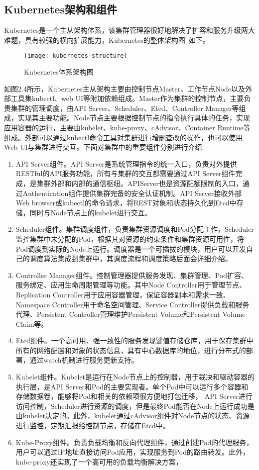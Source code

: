 \subsection{Kubernetes架构和组件}
Kubernetes是一个主从架构体系，该集群管理器很好地解决了扩容和服务升级两大难题，具有较强的横向扩展能力，Kubernetes的整体架构图~\cite{KUBdoc}如下。
\begin{figure}[H] %
	\centering
	\texttt{[image: kubernetes-structure]}
	\caption{Kubernetes体系架构图~\cite{KUBdoc}}
\end{figure}
如图2.4所示，Kubernetes主从架构主要由控制节点Master、工作节点Node以及外部工具集kubectl、web UI等附加依赖组成。Master作为集群的控制节点，主要负责集群的管理调度，由API Server、Scheduler、Etcd、Controller Manager等组成，实现其主要功能。Node节点主要根据控制节点的指令执行具体的任务，实现应用容器的运行，主要由kubelet、kube-proxy、cAdvisor、Container Runtime等组成。外部可以通过kubectl命令工具对集群进行增删查改的操作，也可以使用Web UI与集群进行交互。下面对集群中的重要组件分别进行介绍:
\begin{enumerate}[1.]
	\item  API Server组件。API Server是系统管理指令的统一入口，负责对外提供RESTful的API服务功能，所有与集群的交互都需要通过API Server组件完成，是集群外部和内部的通信枢纽。APIServer也是资源配额限制的入口，通过Authentication组件提供集群完备的安全认证机制。API Server接收外部Web browser或kubectl的命令请求，将REST对象和状态持久化到Etcd中存储，同时与Node节点上的kubelet进行交互。
	\item Scheduler组件。集群调度组件，负责集群资源调度和Pod分配工作，Scheduler监控集群中未分配的Pod，根据其对资源的约束条件和集群资源可用性，将Pod调度到实际的Node上运行。调度器是一个可插拔的模块，用户可以开发自己的调度算法集成到集群中，其调度流程和调度策略后面会详细介绍。
	\item Controller Manager组件。控制管理器提供服务发现、集群管理、Pod扩容、服务绑定、应用生命周期管理等功能。其中Node Controller用于管理节点、Replication Controller用于应用容器管理，保证容器副本和需求一致、Namespace Controller用于命名空间管理、Service Controller提供负载和服务代理、Persistent Controller管理维护Persistent Volume和Persistent Volume Claim等。
	\item Etcd组件。一个高可用、强一致性的服务发现键值存储仓库，用于保存集群中所有的网络配置和对象的状态信息，具有中心数据库的地位，进行分布式的部署，通过watch机制进行服务更新支持。
	\item Kubelet组件。Kubelet是运行在Node节点上的控制器，用于裁决和驱动容器的执行层，是API Server和Pod的主要实现者。单个Pod中可以运行多个容器和存储数据卷，能够将Pod和相关的依赖项很方便地打包迁移，	API Server进行访问控制，Scheduler进行资源的调度，但是最终Pod能否在Node上运行成功是由kubelet决定的。此外，kubelet通过cAdvisor组件对Node节点的状态、资源进行监控，定期汇报给控制节点，存储在Etcd中。
	\item Kube-Proxy组件。负责负载均衡和反向代理组件，通过创建Pod的代理服务，用户可以通过IP地址直接访问Pod应用，实现服务到Pod的路由转发。此外，kube-proxy还实现了一个高可用的负载均衡解决方案，
\end{enumerate}

